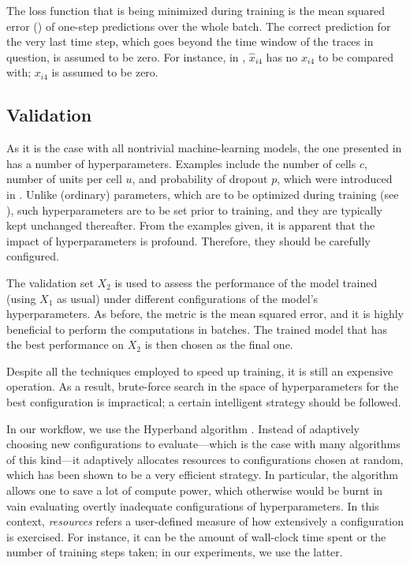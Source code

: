The loss function that is being minimized during training is the mean squared
error () \cite{hastie2009} of one-step predictions over the whole batch.
The correct prediction for the very last time step, which goes beyond the time
window of the traces in question, is assumed to be zero. For instance, in
, $\hat{x}_{i4}$ has no $x_{i4}$ to be compared with; $x_{i4}$ is
assumed to be zero.

\subsection{Validation} 
As it is the case with all nontrivial machine-learning models, the one presented
in  has a number of hyperparameters. Examples include the number of
cells $c$, number of units per cell $u$, and probability of dropout $p$, which
were introduced in . Unlike (ordinary) parameters, which are to
be optimized during training (see ), such hyperparameters are to
be set prior to training, and they are typically kept unchanged thereafter. From
the examples given, it is apparent that the impact of hyperparameters is
profound. Therefore, they should be carefully configured.

The validation set $X_2$ is used to assess the performance of the model trained
(using $X_1$ as usual) under different configurations of the model's
hyperparameters. As before, the metric is the mean squared error, and it is
highly beneficial to perform the computations in batches. The trained model that
has the best performance on $X_2$ is then chosen as the final one.

Despite all the techniques employed to speed up training, it is still an
expensive operation. As a result, brute-force search in the space of
hyperparameters for the best configuration is impractical; a certain intelligent
strategy should be followed.

In our workflow, we use the Hyperband algorithm \cite{li2016}. Instead of
adaptively choosing new configurations to evaluate---which is the case with many
algorithms of this kind---it adaptively allocates resources to configurations
chosen at random, which has been shown to be a very efficient strategy. In
particular, the algorithm allows one to save a lot of compute power, which
otherwise would be burnt in vain evaluating overtly inadequate configurations of
hyperparameters. In this context, \emph{resources} refers a user-defined measure
of how extensively a configuration is exercised. For instance, it can be the
amount of wall-clock time spent or the number of training steps taken; in our
experiments, we use the latter.

